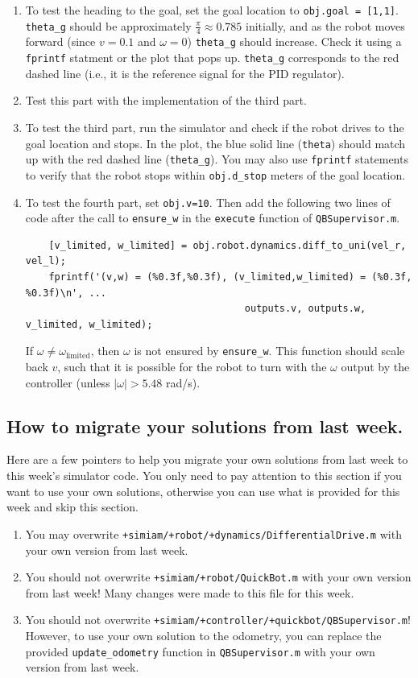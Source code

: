 \documentclass[10pt]{article}
\begin{document}
\begin{enumerate}
  \item To test the heading to the goal, set the goal location to \texttt{obj.goal = [1,1]}. \texttt{theta\_g} should be approximately $\frac{\pi}{4} \approx 0.785$ initially, and as the robot moves forward (since $v=0.1$ and $\omega=0$) \texttt{theta\_g} should increase. Check it using a \texttt{fprintf} statment or the plot that pops up. \texttt{theta\_g} corresponds to the red dashed line (i.e., it is the reference signal for the PID regulator).
  \item Test this part with the implementation of the third part.
  \item To test the third part, run the simulator and check if the robot drives to the goal location and stops. In the plot, the blue solid line (\texttt{theta}) should match up with the red dashed line (\texttt{theta\_g}). You may also use \texttt{fprintf} statements to verify that the robot stops within \texttt{obj.d\_stop} meters of the goal location.
  \item To test the fourth part, set \texttt{obj.v=10}. Then add the following two lines of code after the call to \texttt{ensure\_w} in the \texttt{execute} function of \texttt{QBSupervisor.m}.
  \begin{verbatim}
    [v_limited, w_limited] = obj.robot.dynamics.diff_to_uni(vel_r, vel_l);
    fprintf('(v,w) = (%0.3f,%0.3f), (v_limited,w_limited) = (%0.3f, %0.3f)\n', ...
                                      outputs.v, outputs.w, v_limited, w_limited);
  \end{verbatim}
   If $\omega\neq\omega_{\text{limited}}$, then $\omega$ is not ensured by \texttt{ensure\_w}. This function should scale back $v$, such that it is possible for the robot to turn with the $\omega$ output by the controller (unless $|\omega|>5.48$ rad/s).
\end{enumerate}

\subsection*{How to migrate your solutions from last week.}

Here are a few pointers to help you migrate your own solutions from last week to this week's simulator code. You only need to pay attention to this section if you want to use your own solutions, otherwise you can use what is provided for this week and skip this section.

\begin{enumerate}
 \item You may overwrite \texttt{+simiam/+robot/+dynamics/DifferentialDrive.m} with your own version from last week.
 \item You should not overwrite \texttt{+simiam/+robot/QuickBot.m} with your own version from last week! Many changes were made to this file for this week.
 \item You should not overwrite \texttt{+simiam/+controller/+quickbot/QBSupervisor.m}! However, to use your own solution to the odometry, you can replace the provided \texttt{update\_odometry} function in \texttt{QBSupervisor.m} with your own version from last week.
\end{enumerate}
\end{document}
